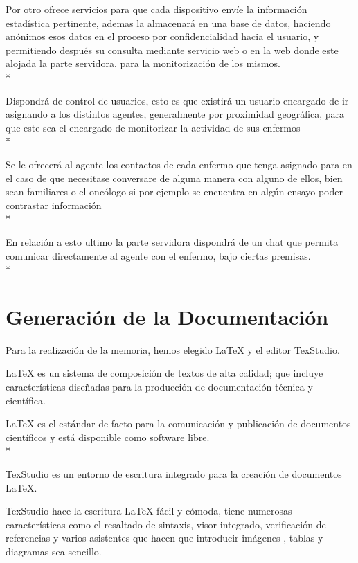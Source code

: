 \documentclass[../pfc.tex]{subfiles}
\begin{document}
	Por otro ofrece servicios para que cada dispositivo envíe la información estadística pertinente, ademas la almacenará en una base de datos, haciendo anónimos esos datos en el proceso por confidencialidad hacia el usuario, y permitiendo después su consulta mediante servicio web o en la web donde este alojada la parte servidora, para la monitorización de los mismos.\\*
	
	Dispondrá de control de usuarios, esto es que existirá un usuario encargado de ir asignando a los distintos agentes, generalmente por proximidad geográfica, para que este sea el encargado de monitorizar la actividad de sus enfermos \\*
	
	Se le ofrecerá al agente los contactos de cada enfermo que tenga asignado para en el caso de que necesitase conversare de alguna manera con alguno de ellos, bien sean familiares o el oncólogo si por ejemplo se encuentra en algún ensayo poder contrastar información\\*
	
	En relación a esto ultimo la parte servidora dispondrá de un chat que permita comunicar directamente al agente con el enfermo, bajo ciertas premisas.\\* 
	
	\clearpage
	
	\section{Generación de la Documentación}
	
	Para la realización de la memoria, hemos elegido LaTeX y el editor TexStudio.
	
	LaTeX es un sistema de composición de textos de alta calidad; que incluye características diseñadas para la producción de documentación técnica y científica.
	
	LaTeX es el estándar de facto para la comunicación y publicación de documentos científicos y está disponible como software libre.\\*
	
	TexStudio es un entorno de escritura integrado para la creación de documentos LaTeX. 
	
	TexStudio hace la escritura LaTeX fácil y cómoda, tiene numerosas características como el resaltado de sintaxis, visor integrado, verificación de referencias y varios asistentes que hacen que introducir imágenes , tablas y diagramas sea sencillo. 
	
\end{document}
